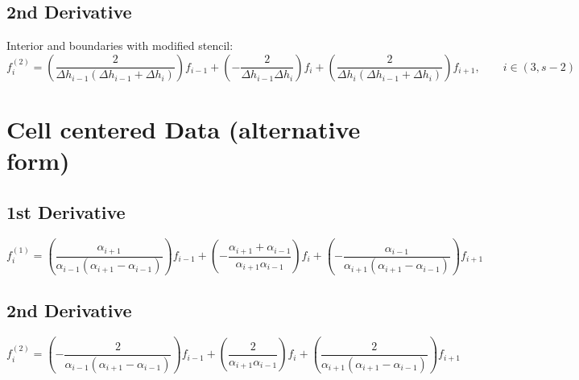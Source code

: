\documentclass[landscape]{article}
\begin{document}
\subsection{2nd Derivative}
Interior and boundaries with modified stencil:
\begin{equation} 
f^{{(2)}}_{i} = \left(\frac{2}{\Delta h_{{i-1}} \left(\Delta h_{{i-1}} + \Delta h_{{i}}\right)}\right)f_{{i-1}}+ \left(- \frac{2}{\Delta h_{{i-1}} \Delta h_{{i}}}\right)f_{{i}}+ \left(\frac{2}{\Delta h_{{i}} \left(\Delta h_{{i-1}} + \Delta h_{{i}}\right)}\right)f_{{i+1}}
, \qquad
  i \in (3,s-2)
 \end{equation} 

\section{Cell centered Data (alternative form)}
\subsection{1st Derivative}
\begin{equation} 
f^{{(1)}}_{i} = \left(\frac{\alpha_{{i+1}}}{\alpha_{{i-1}} \left(\alpha_{{i+1}} - \alpha_{{i-1}}\right)}\right)f_{{i-1}}+ \left(- \frac{\alpha_{{i+1}} + \alpha_{{i-1}}}{\alpha_{{i+1}} \alpha_{{i-1}}}\right)f_{{i}}+ \left(- \frac{\alpha_{{i-1}}}{\alpha_{{i+1}} \left(\alpha_{{i+1}} - \alpha_{{i-1}}\right)}\right)f_{{i+1}}
 \end{equation} 

\subsection{2nd Derivative}
\begin{equation} 
f^{{(2)}}_{i} = \left(- \frac{2}{\alpha_{{i-1}} \left(\alpha_{{i+1}} - \alpha_{{i-1}}\right)}\right)f_{{i-1}}+ \left(\frac{2}{\alpha_{{i+1}} \alpha_{{i-1}}}\right)f_{{i}}+ \left(\frac{2}{\alpha_{{i+1}} \left(\alpha_{{i+1}} - \alpha_{{i-1}}\right)}\right)f_{{i+1}}
 \end{equation} 
\end{document}
